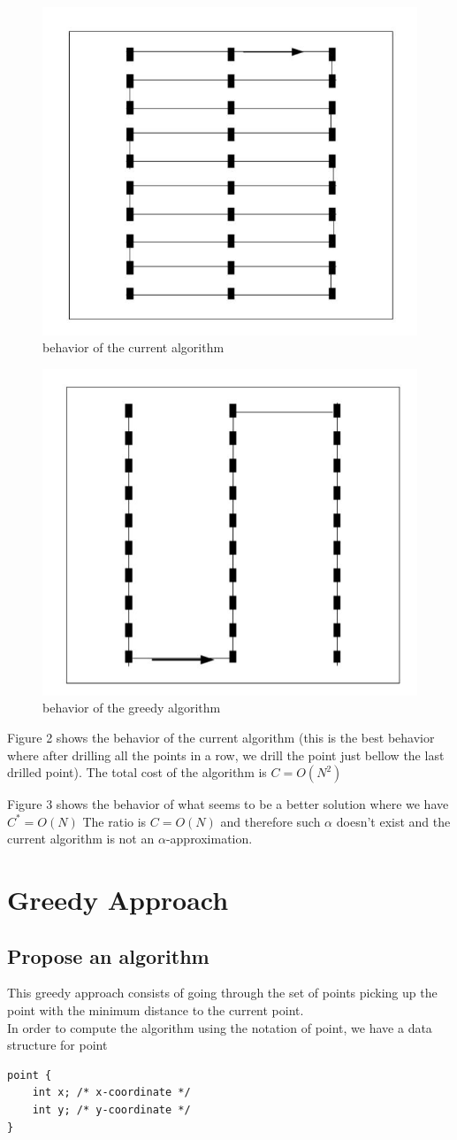 \documentclass{article}
\begin{document}
\begin{figure}[h]
\centering \includegraphics[width=0.3\linewidth]{F1.jpg}
\caption{behavior of the current algorithm}
\end{figure}

\begin{figure}[h]
\centering \includegraphics[width=0.3\linewidth]{F2.jpg}
\caption{behavior of the greedy algorithm}
\end{figure}

Figure 2 shows the behavior of the current algorithm (this is the best behavior where after drilling all the points in a row, we drill the point just bellow the last drilled point). The total cost of the algorithm is 
$C = O(N^{2})$

Figure 3 shows the behavior of what seems to be a better solution where we have $C^{*} = O(N)$
The ratio is $C = O(N)$ and therefore such $\alpha$ doesn't exist and the current algorithm is not an $\alpha$-approximation.

\section{Greedy Approach}
\subsection{Propose an algorithm}
This greedy approach consists of going through the set of points picking up the point with the minimum distance to the current point.\\

In order to compute the algorithm using the notation of point, we have a data structure for point
\begin{lstlisting}
point {
	int x; /* x-coordinate */
	int y; /* y-coordinate */
}
\end{lstlisting}
\end{document}
